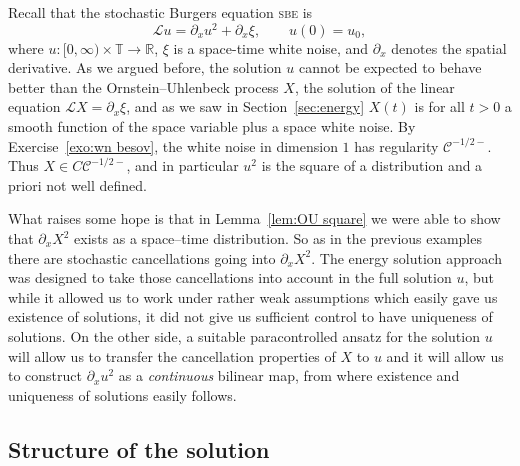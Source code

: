 \documentclass[a4paper,11pt]{article}
\newcommand{\tmname}[1]{\textsc{#1}}
\newcommand{\tmtextit}[1]{{\itshape{#1}}}
\newcommand{\LL}{\mathscr{L}}
\newcommand{\CC}{\mathscr{C}}
\begin{document}
Recall that the stochastic Burgers equation {\tmname{sbe}} is
\begin{equation}
  \LL u = \partial_x u^2 + \partial_x \xi, \hspace{2em} u (0) = u_0,
  \label{eq:sbe-theta}
\end{equation}
where $u : [0, \infty) \times \mathbb{T} \rightarrow \mathbb{R}$, $\xi$ is a
space-time white noise, and $\partial_x$ denotes the spatial derivative. As we
argued before, the solution $u$ cannot be expected to behave better than the
Ornstein--Uhlenbeck process $X$, the solution of the linear equation $\LL X =
\partial_x \xi$, and as we saw in Section~\ref{sec:energy} $X (t)$ is for all
$t > 0$ a smooth function of the space variable plus a space white noise. By
Exercise~\ref{exo:wn besov}, the white noise in dimension $1$ has regularity
$\CC^{- 1 / 2 -}$. Thus $X \in C \CC^{- 1 / 2 -}$, and in particular $u^2$ is
the square of a distribution and a priori not well defined.

What raises some hope is that in Lemma~\ref{lem:OU square} we were able to
show that $\partial_x X^2$ exists as a space--time distribution. So as in the
previous examples there are stochastic cancellations going into $\partial_x
X^2$. The energy solution approach was designed to take those cancellations
into account in the full solution $u$, but while it allowed us to work under
rather weak assumptions which easily gave us existence of solutions, it did
not give us sufficient control to have uniqueness of solutions. On the other
side, a suitable paracontrolled ansatz for the solution $u$ will allow us to
transfer the cancellation properties of $X$ to $u$ and it will allow us to
construct $\partial_x u^2$ as a \tmtextit{continuous} bilinear map, from where
existence and uniqueness of solutions easily follows.

\subsection{Structure of the solution}
\end{document}
